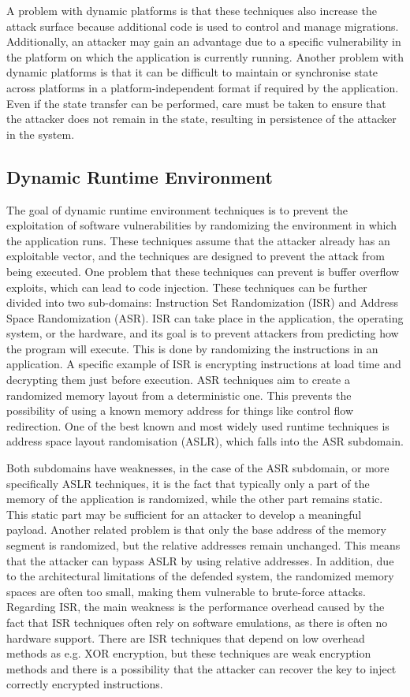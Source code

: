 A problem with dynamic platforms is that these techniques also increase the attack surface because additional code is used to control and manage migrations. Additionally, an attacker may gain an advantage due to a specific vulnerability in the platform on which the application is currently running.   
Another problem with dynamic platforms is that it can be difficult to maintain or synchronise state across platforms in a platform-independent format if required by the application. Even if the state transfer can be performed, care must be taken to ensure that the attacker does not remain in the state, resulting in persistence of the attacker in the system.  


\subsection{Dynamic Runtime Environment}
The goal of dynamic runtime environment techniques is to prevent the exploitation of software vulnerabilities by randomizing the environment in which the application runs. These techniques assume that the attacker already has an exploitable vector, and the techniques are designed to prevent the attack from being executed. One problem that these techniques can prevent is buffer overflow exploits, which can lead to code injection. 
These techniques can be further divided into two sub-domains: Instruction Set Randomization (ISR) and Address Space Randomization (ASR). ISR can take place in the application, the operating system, or the hardware, and its goal is to prevent attackers from predicting how the program will execute. This is done by randomizing the instructions in an application. A specific example of ISR is encrypting instructions at load time and decrypting them just before execution. ASR techniques aim to create a randomized memory layout from a deterministic one. This prevents the possibility of using a known memory address for things like control flow redirection. One of the best known and most widely used runtime techniques is address space layout randomisation (ASLR), which falls into the ASR subdomain. 

Both subdomains have weaknesses, in the case of the ASR subdomain, or more specifically ASLR techniques, it is the fact that typically only a part of the memory of the application is randomized, while the other part remains static. This static part may be sufficient for an attacker to develop a meaningful payload. Another related problem is that only the base address of the memory segment is randomized, but the relative addresses remain unchanged. This means that the attacker can bypass ASLR by using relative addresses. In addition, due to the architectural limitations of the defended system, the randomized memory spaces are often too small, making them vulnerable to brute-force attacks. Regarding ISR, the main weakness is the performance overhead caused by the fact that ISR techniques often rely on software emulations, as there is often no hardware support. There are ISR techniques that depend on low overhead methods as e.g. XOR encryption, but these techniques are weak encryption methods and there is a possibility that the attacker can recover the key to inject correctly encrypted instructions. 


